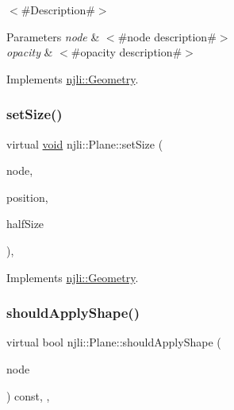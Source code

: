 $<$\#\+Description\#$>$


\begin{DoxyParams}{Parameters}
{\em node} & $<$\#node description\#$>$ \\
\hline
{\em opacity} & $<$\#opacity description\#$>$ \\
\hline
\end{DoxyParams}


Implements \mbox{\hyperlink{classnjli_1_1_geometry_ad4f8c2a3b873a63ee62c87d512b9540d}{njli\+::\+Geometry}}.

\mbox{\label{classnjli_1_1_plane_a69ac7f253c3a2a068f9fd20526dbfa3d}} 
\subsubsection{\texorpdfstring{set\+Size()}{setSize()}}
{\footnotesize\ttfamily virtual \mbox{\hyperlink{_thread_8h_af1e856da2e658414cb2456cb6f7ebc66}{void}} njli\+::\+Plane\+::set\+Size (\begin{DoxyParamCaption}\item[{\mbox{\hyperlink{classnjli_1_1_node}{Node}} $\ast$}]{node,  }\item[{const bt\+Vector3 \&}]{position,  }\item[{const \mbox{\hyperlink{_util_8h_a5f6906312a689f27d70e9d086649d3fd}{f32}}}]{half\+Size }\end{DoxyParamCaption})\hspace{0.3cm}{\ttfamily [protected]}, {\ttfamily [virtual]}}



Implements \mbox{\hyperlink{classnjli_1_1_geometry_a64c12722f84add665776c2b9400108fd}{njli\+::\+Geometry}}.

\mbox{\label{classnjli_1_1_plane_a0ba9fe9f6a03a8438d6204520776250b}} 
\subsubsection{\texorpdfstring{should\+Apply\+Shape()}{shouldApplyShape()}}
{\footnotesize\ttfamily virtual bool njli\+::\+Plane\+::should\+Apply\+Shape (\begin{DoxyParamCaption}\item[{\mbox{\hyperlink{classnjli_1_1_node}{Node}} $\ast$}]{node }\end{DoxyParamCaption}) const\hspace{0.3cm}{\ttfamily [inline]}, {\ttfamily [protected]}, {\ttfamily [virtual]}}



